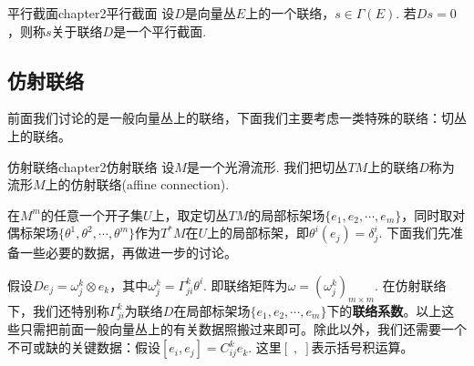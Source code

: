 \begin{mydef}{平行截面}{chapter2平行截面}
	设$D$是向量丛$E$上的一个联络，$s\in \Gamma(E)$. 
	若$Ds=0$，则称$s$关于联络$D$是一个平行截面.
\end{mydef}

\subsection{仿射联络}

前面我们讨论的是一般向量丛上的联络，下面我们主要考虑一类特殊的联络：切丛上的联络。

\begin{mydef}{仿射联络}{chapter2仿射联络}
	设$M$是一个光滑流形. 我们把切丛$TM$上的联络$D$称为流形$M$上的仿射联络(affine connection).
\end{mydef}

在$M^{m}$的任意一个开子集$U$上，取定切丛$TM$的局部标架场$\{e_{1},e_{2},\cdots,e_{m} \}$，同时取对偶标架场$\{\theta^{1},\theta^{2},\cdots,\theta^{m} \}$作为$T^{\ast}M$在$U$上的局部标架，即$\theta^{i}(e_{j})=\delta^{i}_{j}$. 下面我们先准备一些必要的数据，再做进一步的讨论。

假设$De_{j}=\omega_{j}^{k}\otimes e_{k}$，其中$\omega_{j}^{k}=\Gamma^{k}_{ji}\theta^{i}$. 即联络矩阵为$\omega=(\omega_{j}^{k})_{m\times m}$. 在仿射联络下，我们还特别称$\Gamma^{k}_{ji}$为联络$D$在局部标架场$\{e_{1},e_{2},\cdots,e_{m} \}$下的\textbf{联络系数}。以上这些只需把前面一般向量丛上的有关数据照搬过来即可。除此以外，我们还需要一个不可或缺的关键数据：假设$[e_{i},e_{j}]=C_{ij}^{k}e_{k}$. 这里$[\;,\;]$表示括号积运算。

